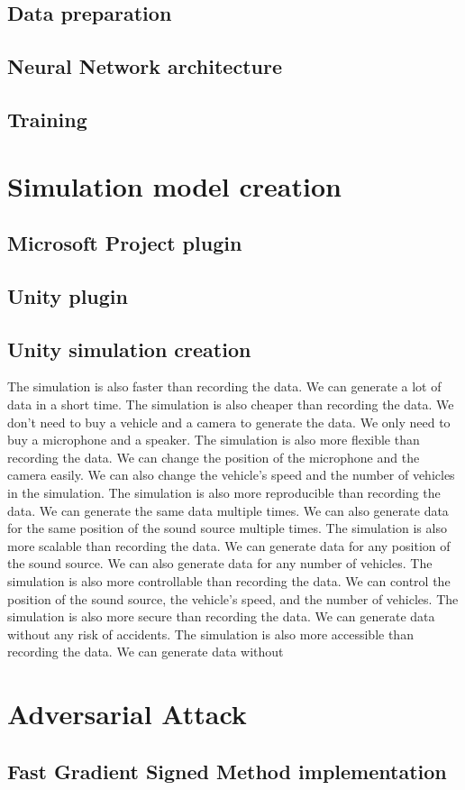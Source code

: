 \subsection{Data preparation}



\subsection{Neural Network architecture}



\subsection{Training}


\section{Simulation model creation}

\subsection{Microsoft Project plugin}

\subsection{Unity plugin}

\subsection{Unity simulation creation}

The simulation is also faster than recording the data. We can generate a lot of data in a short time. The simulation is also cheaper than recording the data. We don't need to buy a vehicle and a camera to generate the data. We only need to buy a microphone and a speaker. The simulation is also more flexible than recording the data. We can change the position of the microphone and the camera easily. We can also change the vehicle's speed and the number of vehicles in the simulation. The simulation is also more reproducible than recording the data. We can generate the same data multiple times. We can also generate data for the same position of the sound source multiple times. The simulation is also more scalable than recording the data. We can generate data for any position of the sound source. We can also generate data for any number of vehicles. The simulation is also more controllable than recording the data. We can control the position of the sound source, the vehicle's speed, and the number of vehicles. The simulation is also more secure than recording the data. We can generate data without any risk of accidents. The simulation is also more accessible than recording the data. We can generate data without

\section{Adversarial Attack}

\subsection{Fast Gradient Signed Method implementation}

